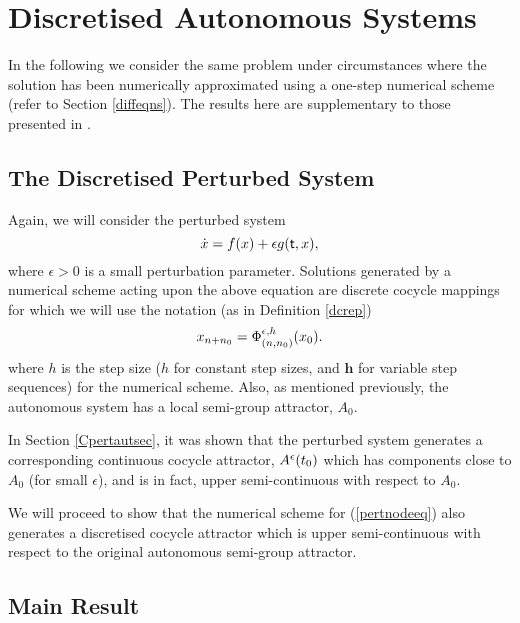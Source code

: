 
\section{Discretised Autonomous Systems}\label{Dpertautsec}

In the following we consider the same problem under circumstances
where the solution has been numerically approximated using a one-step
numerical scheme (refer to Section \ref{diffeqns}). The results here are
supplementary to those presented in \cite{PkSt97}.

\subsection{The Discretised Perturbed System}

Again, we will consider the perturbed system
\begin{equation}
  \dot{x} = f(x) + \epsilon g( \mathsf{\mathsf{t}},x),
\end{equation}
where $\epsilon > 0$ is a small perturbation parameter. Solutions
generated by a numerical scheme acting upon the above equation are
discrete cocycle mappings for which we will use the notation (as in
Definition \ref{dcrep})
\[ x_{n + n_0} = \Phi^{\epsilon, h}_{(n,n_0)}(x_0). \]
where $h$ is the step size ($h$ for constant step sizes, and $\textbf{h}$ for
variable step sequences) for the numerical scheme. Also, as mentioned
previously, the autonomous system has a local semi-group attractor, $A_0$.

In Section \ref{Cpertautsec}, it was shown that the perturbed system
generates a corresponding continuous cocycle attractor, $A^{\epsilon}(t_{0})$
which has components close to $A_0$ (for small $\epsilon$), and is in fact,
upper semi-continuous with respect to $A_0$.

We will proceed to show that the numerical scheme for
(\ref{pertnodeeq}) also generates a discretised cocycle attractor
which is upper semi-continuous with respect to the original
autonomous semi-group attractor.

\subsection{Main Result}

